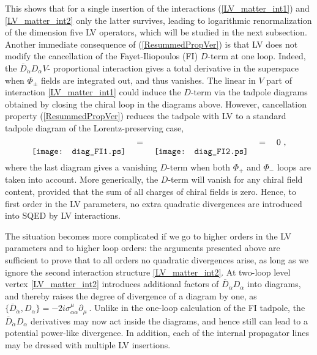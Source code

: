 \documentclass[12pt]{revtex4}
\begin{document}
%
This shows that for a single insertion of the interactions
(\ref{LV_matter_int1}) and \eqref{LV_matter_int2} only the latter
survives, leading to logarithmic renormalization of the dimension five
LV operators, which will be studied in the next subsection. 
Another immediate consequence of (\ref{ResummedPropVer}) is that LV
does not  modify the cancellation of the Fayet-Iliopoulos (FI)
$D$-term at one loop. Indeed, the 
$\overline{D}_{\dot\alpha}D_\alpha V$-
proportional interaction gives a total derivative in the superspace
when $\Phi_{\pm}$ fields are integrated out, and thus vanishes. 
The linear in $V$ part of interaction  \eqref{LV_matter_int1} could
induce the $D$-term via the tadpole diagrams obtained by closing the
chiral loop in the diagrams above. However, cancellation  property
(\ref{ResummedPropVer}) reduces the tadpole with LV to a standard 
tadpole diagram of the Lorentz-preserving case, 
%
\begin{equation}
\raisebox{-2.5ex}{\texttt{[image: diag\_FI1.ps]}}
\quad = \quad 
\raisebox{-2.5ex}{\texttt{[image: diag\_FI2.ps]}}
\quad = \quad 0~,
\end{equation}
%
where the last diagram gives a vanishing $D$-term when both $\Phi_+$
and $\Phi_-$ loops are taken into account. More generically, the
$D$-term will vanish for any chiral field content, provided that the
sum of all charges of chiral fields is zero. Hence, to first order in
the LV parameters, no extra quadratic divergences are introduced into
SQED by LV interactions. 


The situation becomes more complicated if we go to higher orders in 
the LV parameters and to higher loop orders: the arguments 
presented above are sufficient to
prove that to all orders no quadratic divergences arise, as long as we
ignore the second interaction structure \eqref{LV_matter_int2}. At two-loop 
level vertex \eqref{LV_matter_int2} introduces additional factors of 
$\overline{D}_{\dot\alpha} D_\alpha$ into diagrams, and thereby raises 
the degree of divergence of a diagram by one, as 
\(
\{\overline{D}_{\dot\alpha}, D_\alpha\} = 
-2 i \sigma_{\alpha\dot\alpha}^\mu \partial_\mu~.
\) 
Unlike in the one-loop calculation of the FI tadpole, the 
$\overline{D}_{\dot\alpha} D_\alpha$ derivatives may now act inside
the diagrams, and hence still can lead to a potential power-like
divergence. In addition, each of the internal propagator lines may be
dressed with multiple LV insertions. 
\end{document}
